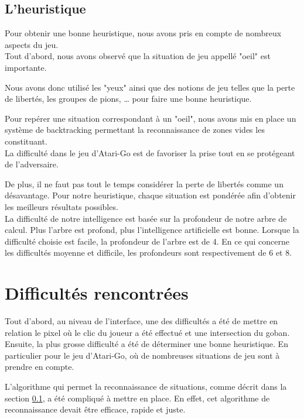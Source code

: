 \documentclass[11pt,a4paper]{article}
\begin{document}
\subsection{L'heuristique}
	\label{heuristique}
Pour obtenir une bonne heuristique, nous avons pris en compte de nombreux
aspects du jeu. \\

Tout d'abord, nous avons observé que la situation de jeu
appellé "oeil" est importante.

Nous avons donc utilisé les "yeux" ainsi que des notions de jeu telles que la
perte de libertés, les groupes de pions, \dots{} pour faire une bonne
heuristique.

Pour repérer une situation correspondant à un "oeil", nous avons mis en place
un système de backtracking permettant la reconnaissance de zones vides les
constituant.\\

La difficulté dans le jeu d'Atari-Go est de favoriser la prise tout en se
protégeant de l'adversaire.

De plus, il ne faut pas tout le temps considérer la perte de libertés comme un
désavantage.
Pour notre heuristique, chaque situation est pondérée afin d'obtenir les
meilleurs résultats possibles.\\

La difficulté de notre intelligence est basée sur la profondeur de notre arbre
de calcul. Plus l'arbre est profond, plus l'intelligence artificielle est bonne.
Lorsque la difficulté choisie est facile, la profondeur de l'arbre est de 4. En
ce qui concerne les difficultés moyenne et difficile, les profondeurs sont
respectivement de 6 et 8.\\


\clearpage
\section{Difficultés rencontrées}
Tout d'abord, au niveau de l'interface, une des difficultés a été de mettre en
relation le pixel où le clic du joueur a été effectué et une intersection du
goban.\\

Ensuite, la plus grosse difficulté a été de déterminer une bonne heuristique.
En particulier pour le jeu d'Atari-Go, où de nombreuses situations de jeu sont
à prendre en compte.

L'algorithme qui permet la reconnaissance de situations, comme décrit dans la
section \ref{heuristique}, a été compliqué à mettre en place. En effet, cet
algorithme de reconnaissance devait être efficace, rapide et juste.\\
\end{document}
